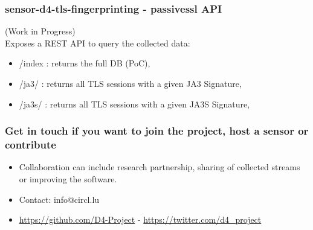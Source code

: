 \documentclass{beamer}
\begin{document}
\begin{frame}[fragile]
        \frametitle{sensor-d4-tls-fingerprinting - passivessl API} 
        (Work in Progress) \\
        \vspace{.8cm} 
        Exposes a REST API to query the collected data:
        \begin{itemize}
          \item /index : returns the full DB (PoC), 
          \item /ja3/ : returns all TLS sessions with a given JA3 Signature,
          \item /ja3s/ : returns all TLS sessions with a given JA3S Signature,
        \end{itemize}
\end{frame}


\begin{frame}
\frametitle{Get in touch if you want to join the project, host a sensor or contribute}
\begin{itemize}
\item Collaboration can include research partnership, sharing of collected streams or improving the software.
\item Contact: info@circl.lu
\item \url{https://github.com/D4-Project} -  \url{https://twitter.com/d4_project}
\end{itemize}
\end{frame}
\end{document}
